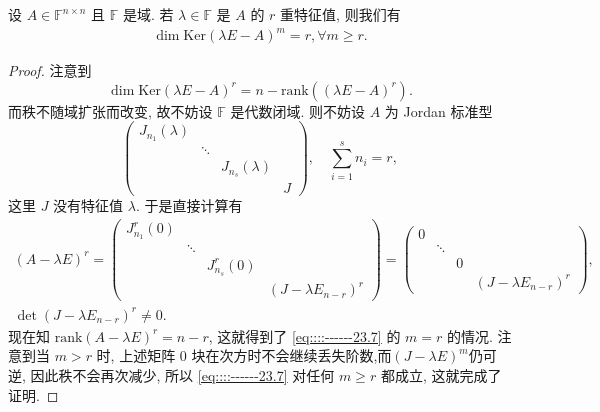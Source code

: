 \documentclass[../../main.tex]{subfiles}
\begin{document}
\begin{lemma}[根子空间维数]\label{lemma:根子空间维数}
设 \( A \in \mathbb{F}^{n \times n} \) 且 \( \mathbb{F} \) 是域. 若 \( \lambda \in \mathbb{F} \) 是 \( A \) 的 \( r \) 重特征值, 则我们有
\begin{align}
\dim \mathrm{Ker} \left( \lambda E - A \right)^m = r, \forall m \geqslant r. \label{eq::::------23.7}
\end{align}
\end{lemma}
\begin{proof}
注意到
\[
\dim \mathrm{Ker} \left( \lambda E - A \right)^r = n - \mathrm{rank} \left( \left( \lambda E - A \right)^r \right).
\]
而秩不随域扩张而改变, 故不妨设 \( \mathbb{F} \) 是代数闭域. 则不妨设 \( A \) 为 Jordan 标准型
\[
\begin{pmatrix}
J_{n_1} \left( \lambda \right) & & & \\
& \ddots & & \\
& & J_{n_s} \left( \lambda \right) & \\
& & & J
\end{pmatrix}, \quad \sum_{i=1}^s n_i = r,
\]
这里 \( J \) 没有特征值 \( \lambda \). 于是直接计算有
\begin{gather*}
\left( A - \lambda E \right)^r = \begin{pmatrix}
J_{n_1}^r \left( 0 \right) & & & \\
& \ddots & & \\
& & J_{n_s}^r \left( 0 \right) & \\
& & & \left( J - \lambda E_{n-r} \right)^r
\end{pmatrix} = \begin{pmatrix}
0 & & & \\
& \ddots & & \\
& & 0 & \\
& & & \left( J - \lambda E_{n-r} \right)^r
\end{pmatrix}, 
\\
\det \left( J - \lambda E_{n-r} \right)^r \neq 0.
\end{gather*}
现在知 \( \mathrm{rank} \left( A - \lambda E \right)^r = n - r \), 这就得到了 \eqref{eq::::------23.7} 的 \( m = r \) 的情况. 注意到当 \( m > r \) 时, 上述矩阵 \( 0 \) 块在次方时不会继续丢失阶数,而$\left( J - \lambda E \right)^m$仍可逆, 因此秩不会再次减少, 所以 \eqref{eq::::------23.7} 对任何 \( m \geqslant r \) 都成立, 这就完成了证明.


\end{proof}
\end{document}
